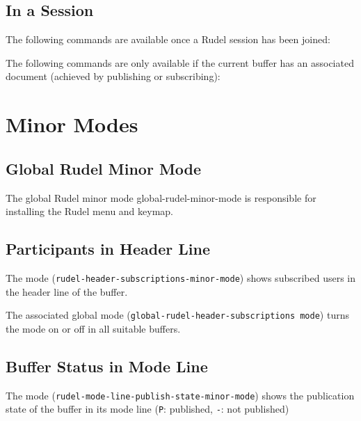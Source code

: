 

\subsection{In a Session}

The following commands are available once a Rudel session has been
joined:



The following commands are only available if the current buffer has an
associated document (achieved by publishing or subscribing):


\section{Minor Modes}

\subsection{Global Rudel Minor Mode}

The global Rudel minor mode global-rudel-minor-mode is responsible for
installing the Rudel menu and keymap.

\subsection{Participants in Header Line}

The mode ({\tt rudel-header-subscriptions-minor-mode}) shows
subscribed users in the header line of the buffer.

The associated global mode ({\tt global-rudel-header-subscriptions
mode}) turns the mode on or off in all suitable buffers.

\subsection{Buffer Status in Mode Line}

The mode ({\tt rudel-mode-line-publish-state-minor-mode}) shows the
publication state of the buffer in its mode line ({\tt P}: published,
{\tt -}: not published)

